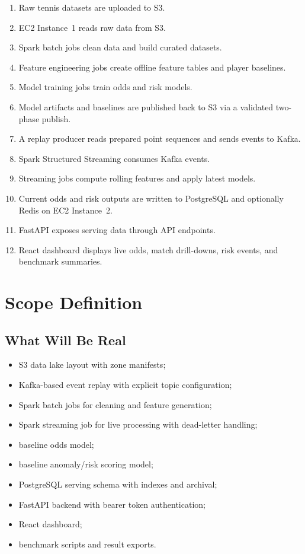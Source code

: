 \documentclass[11pt,a4paper]{article}
\begin{document}
\begin{enumerate}[nosep]
  \item Raw tennis datasets are uploaded to S3.
  \item EC2 Instance~1 reads raw data from S3.
  \item Spark batch jobs clean data and build curated datasets.
  \item Feature engineering jobs create offline feature tables and player baselines.
  \item Model training jobs train odds and risk models.
  \item Model artifacts and baselines are published back to S3 via a validated two-phase publish.
  \item A replay producer reads prepared point sequences and sends events to Kafka.
  \item Spark Structured Streaming consumes Kafka events.
  \item Streaming jobs compute rolling features and apply latest models.
  \item Current odds and risk outputs are written to PostgreSQL and optionally Redis on EC2 Instance~2.
  \item FastAPI exposes serving data through API endpoints.
  \item React dashboard displays live odds, match drill-downs, risk events, and benchmark summaries.
\end{enumerate}

\section{Scope Definition}

\subsection{What Will Be Real}

\begin{itemize}[nosep]
  \item S3 data lake layout with zone manifests;
  \item Kafka-based event replay with explicit topic configuration;
  \item Spark batch jobs for cleaning and feature generation;
  \item Spark streaming job for live processing with dead-letter handling;
  \item baseline odds model;
  \item baseline anomaly/risk scoring model;
  \item PostgreSQL serving schema with indexes and archival;
  \item FastAPI backend with bearer token authentication;
  \item React dashboard;
  \item benchmark scripts and result exports.
\end{itemize}
\end{document}
